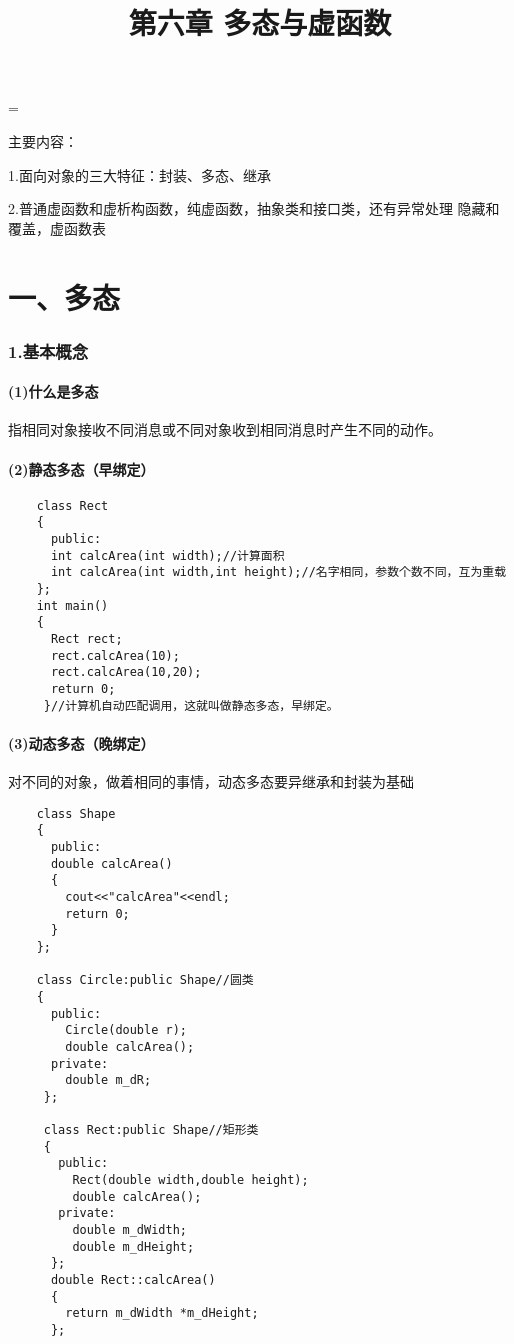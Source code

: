 \documentclass{article}
\begin{document}
 
\hfuzz=\maxdimen
{}
\begin{CJK}{UTF8}{gbsn}  
\title{第六章  多态与虚函数}
\author{}
\date{}
\maketitle
\subparagraph*{}
主要内容：
\subparagraph*{}
1.面向对象的三大特征：封装、多态、继承
\subparagraph*{}
2.普通虚函数和虚析构函数，纯虚函数，抽象类和接口类，还有异常处理
隐藏和覆盖，虚函数表
\part*{一、多态}
\section*{1.基本概念}
\subsection*{(1)什么是多态}
\subparagraph*{}
指相同对象接收不同消息或不同对象收到相同消息时产生不同的动作。
\subsection*{(2)静态多态（早绑定）}
\begin{verbatim}
    class Rect
    {
      public:
      int calcArea(int width);//计算面积
      int calcArea(int width,int height);//名字相同，参数个数不同，互为重载
    };
    int main()
    {
      Rect rect;
      rect.calcArea(10);
      rect.calcArea(10,20);
      return 0;
     }//计算机自动匹配调用，这就叫做静态多态，早绑定。
\end{verbatim}
\subsection*{(3)动态多态（晚绑定）}
\subparagraph*{}
对不同的对象，做着相同的事情，动态多态要异继承和封装为基础
\begin{verbatim}
    class Shape
    {
      public:
      double calcArea()
      {
        cout<<"calcArea"<<endl;
        return 0;
      }
    };
    
    class Circle:public Shape//圆类
    {
      public:
        Circle(double r);
        double calcArea();
      private:
        double m_dR;
     };
     
     class Rect:public Shape//矩形类
     {
       public:
         Rect(double width,double height);
         double calcArea();
       private:
         double m_dWidth;
         double m_dHeight;
      };
      double Rect::calcArea()
      {
        return m_dWidth *m_dHeight;        
      };
      

\end{verbatim}
\end{CJK}
\end{document}
